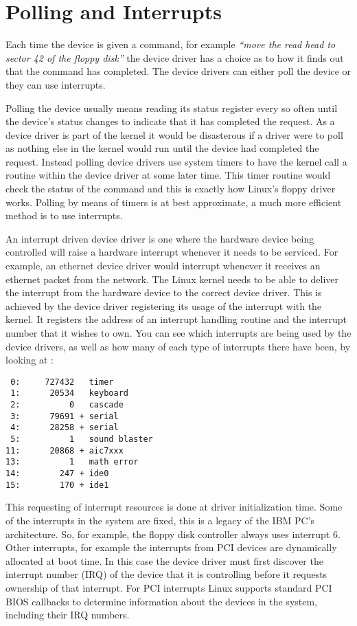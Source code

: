 \section{Polling and Interrupts}
Each time the device is given a command, for example {\em ``move the read head to sector
42 of the floppy disk''} the device driver has a choice as to how it finds out that the
command has completed.
The device drivers can either poll the device or they can use interrupts.

Polling the device usually means reading its status register every so often until the device's
status changes to indicate that it has completed the request.
As a device driver is part of the kernel it would be disasterous if a driver were to
poll as nothing else in the kernel would run until the device had completed the request.
Instead polling device drivers use system timers to have the kernel call a routine within
the device driver at some later time.
This timer routine would check the status of the command and this is exactly how Linux's floppy
driver works.
Polling by means of timers is at best approximate, a much more efficient method is to use interrupts.

An interrupt driven device driver is one where the hardware device being controlled will
raise a hardware interrupt whenever it needs to be serviced.
For example, an ethernet device driver would interrupt whenever it receives an ethernet
packet from the network.
The Linux kernel needs to be able to deliver the interrupt from the hardware device to 
the correct device driver.
This is achieved by the device driver registering its usage of the interrupt with the
kernel.
It registers the address of an interrupt handling routine and the interrupt number
that it wishes to own.
You can see which interrupts are being used by the device drivers, as well
as how many of each type of interrupts there have been, by looking at :
\begin{verbatim}
 0:     727432   timer
 1:      20534   keyboard
 2:          0   cascade
 3:      79691 + serial
 4:      28258 + serial
 5:          1   sound blaster
11:      20868 + aic7xxx
13:          1   math error
14:        247 + ide0
15:        170 + ide1
\end{verbatim}
This requesting of interrupt resources is done at driver initialization time.
Some of the interrupts in the system are fixed, this is a legacy of the IBM PC's 
architecture.
So, for example, the floppy disk controller always uses interrupt 6.
Other interrupts, for example the interrupts from PCI devices are dynamically 
allocated at boot time.
In this case the device driver must first discover the interrupt number (IRQ) of
the device that it is controlling before it requests ownership of that interrupt.
For PCI interrupts Linux supports standard PCI BIOS callbacks to determine information
about the devices in the system, including their IRQ numbers.

